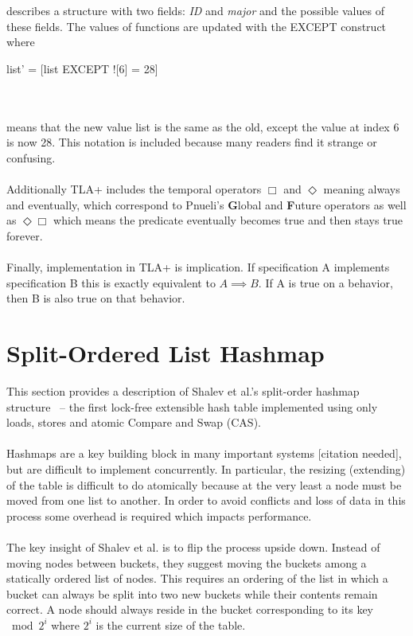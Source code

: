 \documentclass{uit-thesis}
\begin{document}
\\\\
describes a structure with two fields: \textit{ID} and \textit{major} and the possible values of these fields. The values of functions are updated with the EXCEPT construct where 
\begin{tla}
    list' = [list EXCEPT ![6] = 28]
\end{tla}
\begin{tlatex}
%
\end{tlatex}
\\\\
means that the new value list is the same as the old, except the value at index 6 is now 28. This notation is included because many readers find it strange or confusing.
\\\\
Additionally TLA+ includes the temporal operators $\Box$ and $\Diamond$ meaning always and eventually, which correspond to Pnueli's \textbf{G}lobal and \textbf{F}uture operators as well as $\Diamond\Box$ which means the predicate eventually becomes true and then stays true forever.
\\\\
Finally, implementation in TLA+ is implication. If specification A implements specification B this is exactly equivalent to $A \implies B$. If A is true on a behavior, then B is also true on that behavior.

\section{Split-Ordered List Hashmap}\label{sec:hashmap}
This section provides a description of Shalev et al.'s split-order hashmap structure~\cite{Shalev2006} -- the first lock-free extensible hash table implemented using only loads, stores and atomic Compare and Swap (CAS).
\\\\
Hashmaps are a key building block in many important systems [citation needed], but are difficult to implement concurrently. In particular, the resizing (extending) of the table is difficult to do atomically because at the very least a node must be moved from one list to another. In order to avoid conflicts and loss of data in this process some overhead is required which impacts performance.
\\\\
The key insight of Shalev et al. is to flip the process upside down. Instead of moving nodes between buckets, they suggest moving the buckets among a statically ordered list of nodes. This requires an ordering of the list in which a bucket can always be split into two new buckets while their contents remain correct. A node should always reside in the bucket corresponding to its key $\bmod{2^i}$ where $2^i$ is the current size of the table.
\end{document}
